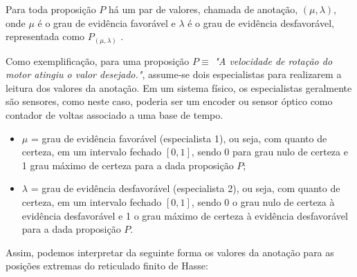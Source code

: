 Para toda proposição $P$ há um par de valores, chamada de anotação, $(\mu , \lambda )$, onde $\mu$ é o grau de evidência favorável e $\lambda $ é o grau de evidência desfavorável, representada como  $P_{( \mu , \lambda )}$ .

Como exemplificação, para uma proposição $P \equiv$ \emph{"A velocidade de rotação do motor atingiu o valor desejado."}, assume-se dois especialistas para realizarem a leitura dos valores da anotação. Em um sistema físico, os especialistas geralmente são sensores, como neste caso, poderia ser um encoder ou sensor óptico como contador de voltas associado a uma base de tempo.

\begin{itemize}
\item 
$\mu$ = grau de evidência favorável (especialista 1), ou seja, com quanto de certeza, em um intervalo fechado $[0,1]$, sendo 0 para grau nulo de certeza e 1 grau máximo de certeza para a dada proposição $P$;

\item
$\lambda$ = grau de evidência desfavorável (especialista 2), ou seja, com quanto de certeza, em um intervalo fechado $[0,1]$, sendo 0 o grau nulo de certeza à evidência desfavorável e 1 o grau máximo de certeza à evidência desfavorável para a dada proposição $P$.

\end{itemize}


Assim, podemos interpretar da seguinte forma os valores da anotação para as posições extremas do reticulado finito de Hasse:

